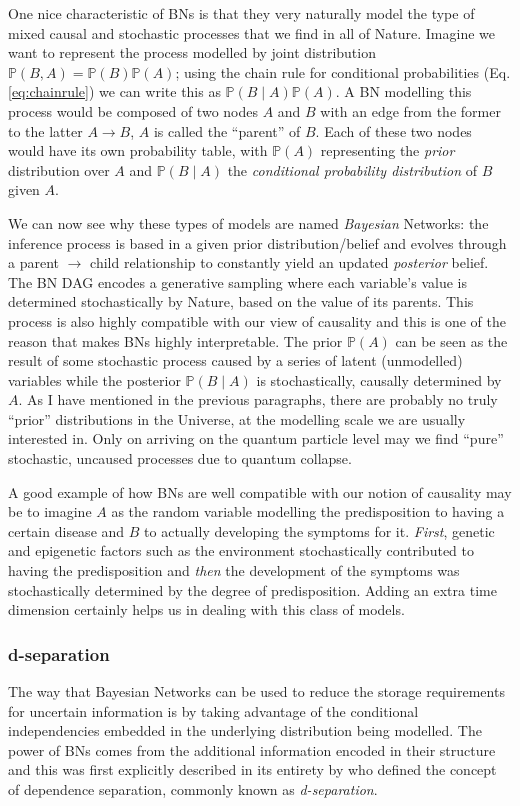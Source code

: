 One nice characteristic of BNs is that they very naturally model the type of mixed causal and stochastic processes that we find in all of Nature.
Imagine we want to represent the process modelled by joint distribution $\mathbb{P}(B,A) = \mathbb{P}(B) \mathbb{P}(A)$; using the chain rule for conditional probabilities (Eq. \ref{eq:chainrule}) we can write this as $\mathbb{P}(B \mid A) \mathbb{P}(A)$.
A BN modelling this process would be composed of two nodes $A$ and $B$ with an edge from the former to the latter $A \rightarrow B$, $A$ is called the ``parent'' of $B$.  Each of these two nodes would have its own probability table, with $\mathbb{P}(A)$ representing the \textit{prior} distribution over $A$ and $\mathbb{P}(B \mid A)$ the \textit{conditional probability distribution} of $B$ given $A$.

We can now see why these types of models are named \textit{Bayesian} Networks: the inference process is based in a given prior distribution/belief and evolves through a parent $\rightarrow$ child relationship to constantly yield an updated \textit{posterior} belief.
The BN DAG encodes a generative sampling where each variable's value is determined stochastically by Nature, based on the value of its parents.
This process is also highly compatible with our view of causality and this is one of the reason that makes BNs highly interpretable.
The prior $\mathbb{P}(A)$ can be seen as the result of some stochastic process caused by a series of latent (unmodelled) variables while the posterior $\mathbb{P}(B \mid A)$ is stochastically, causally determined by $A$. 
As I have mentioned in the previous paragraphs, there are probably no truly ``prior'' distributions in the Universe, at the modelling scale we are usually interested in.
Only on arriving on the quantum particle level may we find ``pure'' stochastic, uncaused processes due to quantum collapse.

A good example of how BNs are well compatible with our notion of causality may be to imagine $A$ as the random variable modelling the predisposition to having a certain disease and $B$ to actually developing the symptoms for it.
\textit{First}, genetic and epigenetic factors such as the environment stochastically contributed to having the predisposition and \textit{then} the development of the symptoms was stochastically determined by the degree of predisposition.
Adding an extra time dimension certainly helps us in dealing with this class of models.

\subsubsection{d-separation}
The way that Bayesian Networks can be used to reduce the storage requirements for uncertain information is by taking advantage of the conditional independencies embedded in the underlying distribution being modelled.
The power of BNs comes from the additional information encoded in their structure and this was first explicitly described in its entirety by \cite{Pearl1988} who defined the concept of dependence separation, commonly known as \textit{d-separation}.

